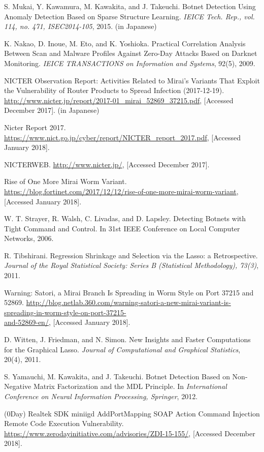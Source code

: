 \documentclass{sig-alternate-10pt}
\begin{document}
\begin{thebibliography}{25}
S. Mukai, Y. Kawamura, M. Kawakita, and J. Takeuchi. Botnet Detection Using Anomaly Detection Based on Sparse Structure Learning. {\it IEICE Tech. Rep., vol. 114, no. 471, ISEC2014-105}, 2015. (in Japanese)

K. Nakao, D. Inoue, M. Eto, and K. Yoshioka. Practical Correlation Analysis Between Scan and Malware Profiles Against Zero-Day Attacks Based on Darknet Monitoring. {\it IEICE TRANSACTIONS on Information and Systems}, 92(5), 2009.

NICTER Observation Report: Activities Related to Mirai's Variants That Exploit the Vulnerability of Router Products to Spread Infection (2017-12-19). \url{http://www.nicter.jp/report/2017-01_mirai_52869_37215.pdf}, [Accessed December 2017]. (in Japanese)

Nicter Report 2017. \url{https://www.nict.go.jp/cyber/report/NICTER_report_2017.pdf}, [Accessed January 2018].

NICTERWEB. \url{http://www.nicter.jp/}, [Accessed December 2017].

Rise of One More Mirai Worm Variant. \url{https://blog.fortinet.com/2017/12/12/rise-of-one-more-mirai-worm-variant}, [Accessed January 2018].

W. T. Strayer, R. Walsh, C. Livadas, and D. Lapsley. Detecting Botnets with Tight Command and Control. In {31st IEEE Conference on Local Computer Networks}, 2006.

R. Tibshirani. Regression Shrinkage and Selection via the Lasso: a Retrospective. {\it Journal of the Royal Statistical Society: Series B (Statistical Methodology), 73(3)}, 2011.

Warning: Satori, a Mirai Branch Is Spreading in Worm Style on Port 37215 and 52869. \url{http://blog.netlab.360.com/warning-satori-a-new-mirai-variant-is-}\\\url{spreading-in-worm-style-on-port-37215-}\\\url{and-52869-en/}, [Accessed January 2018].

D. Witten, J. Friedman, and N. Simon. New Insights and Faster Computations for the Graphical Lasso. {\it Journal of Computational and Graphical Statistics}, 20(4), 2011.

S. Yamauchi, M. Kawakita, and J. Takeuchi. Botnet Detection Based on Non-Negative Matrix Factorization and the MDL Principle. In {\it International Conference on Neural Information Processing, Springer}, 2012.

(0Day) Realtek SDK miniigd AddPortMapping SOAP Action Command Injection Remote Code Execution Vulnerability. \url{https://www.zerodayinitiative.com/advisories/ZDI-15-155/}, [Accessed December 2018].

\end{thebibliography}
\end{document}

